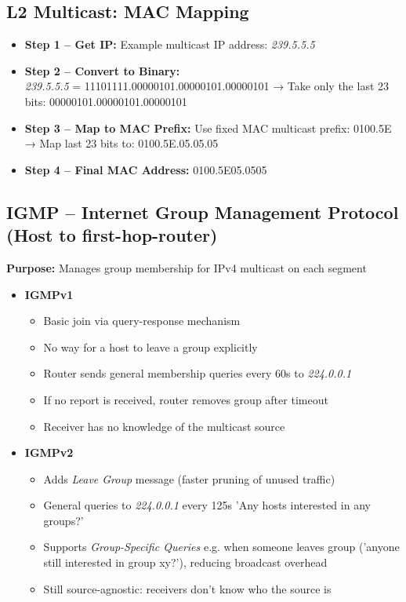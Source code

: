 \begin{multicols*}{5}
		\subsection{L2 Multicast: MAC Mapping}
		\begin{itemize}
			\item \textbf{Step 1 – Get IP:} Example multicast IP address: \textit{239.5.5.5}
			\item \textbf{Step 2 – Convert to Binary:} \\
			\textit{239.5.5.5} = 11101111.00000101.00000101.00000101 
			→ Take only the last 23 bits: 00000101.00000101.00000101
			\item \textbf{Step 3 – Map to MAC Prefix:}  
			Use fixed MAC multicast prefix: 0100.5E
			→ Map last 23 bits to: 0100.5E.05.05.05
			\item \textbf{Step 4 – Final MAC Address:}  
			0100.5E05.0505
		\end{itemize}
		
		\subsection{IGMP – Internet Group Management Protocol (Host to first-hop-router)}
		\textbf{Purpose:} Manages group membership for IPv4 multicast on each segment
		\textit{}
		\begin{itemize}
			\item \textbf{IGMPv1}
			\begin{itemize}
				\item Basic join via query-response mechanism
				\item No way for a host to leave a group explicitly
				\item Router sends general membership queries every 60s to \textit{224.0.0.1}
				\item If no report is received, router removes group after timeout
				\item Receiver has no knowledge of the multicast source
			\end{itemize}
			
			\item \textbf{IGMPv2}
			\begin{itemize}
				\item Adds \textit{Leave Group} message (faster pruning of unused traffic)
				\item General queries to \textit{224.0.0.1} every 125s 'Any hosts interested in any groups?'
				\item Supports \textit{Group-Specific Queries} e.g. when someone leaves group ('anyone still interested in group xy?'), reducing broadcast overhead
				\item Still source-agnostic: receivers don’t know who the source is
			\end{itemize}
			

\end{itemize}
\end{multicols*}
